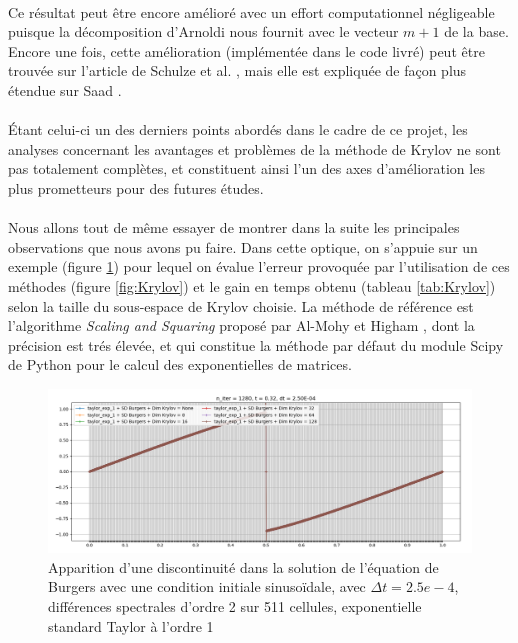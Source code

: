 \paragraph{}
Ce résultat peut être encore amélioré avec un effort computationnel négligeable puisque la décomposition d'Arnoldi nous fournit avec le vecteur $m+1$ de la base. Encore une fois, cette amélioration (implémentée dans le code livré) peut être trouvée sur l'article de Schulze et al. \cite{Krylov:1}, mais elle est expliquée de façon plus étendue sur Saad \cite{Krylov:2}.

\paragraph{}
Étant celui-ci un des derniers points abordés dans le cadre de ce projet, les analyses concernant les avantages et problèmes de la méthode de Krylov ne sont pas totalement complètes, et constituent ainsi l'un des axes d'amélioration les plus prometteurs pour des futures études.

\paragraph{}
Nous allons tout de même essayer de montrer dans la suite les principales observations que nous avons pu faire. Dans cette optique, on s'appuie sur un exemple (figure \ref{fig:BurgersKrylov}) pour lequel on évalue l'erreur provoquée par l'utilisation de ces méthodes (figure \ref{fig:Krylov}) et le gain en temps obtenu (tableau \ref{tab:Krylov}) selon la taille du sous-espace de Krylov choisie. La méthode de référence est l'algorithme \textit{Scaling and Squaring} proposé par Al-Mohy et Higham \cite{scipy}, dont la précision est trés élevée, et qui constitue la méthode par défaut du module Scipy de Python pour le calcul des exponentielles de matrices. 

\begin{figure}[h!]
        \centering
        \includegraphics[width=\textwidth]{images/KrylovBurgers.png}
        \caption{Apparition d'une discontinuité dans la solution de l'équation de Burgers avec une condition initiale sinusoïdale, avec $\Delta t = 2.5e-4$, différences spectrales d'ordre 2 sur 511 cellules, exponentielle standard Taylor à l'ordre 1}
        \label{fig:BurgersKrylov}
\end{figure}

